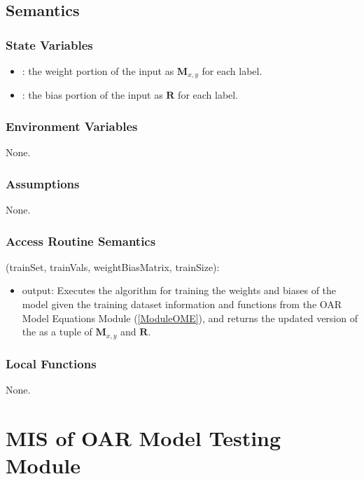 \documentclass[12pt, titlepage]{article}
\begin{document}
\subsection{Semantics}

\subsubsection{State Variables}

\begin{itemize}
\item {}: the weight portion of the  input as $\mathbf{M}_{x,y}$ for each label.
\item {}: the bias portion of the  input as $\mathbf{R}$ for each label.
\end{itemize}

\subsubsection{Environment Variables}

None.

\subsubsection{Assumptions}

None.

\subsubsection{Access Routine Semantics}

\noindent {}(trainSet, trainVals, weightBiasMatrix, trainSize):
\begin{itemize}
\item output: Executes the algorithm for training the weights and biases of the model given the
training dataset information and functions from the OAR Model Equations Module (\ref{ModuleOME}), and
returns the updated version of the  as a tuple of $\mathbf{M}_{x,y}$ and $\mathbf{R}$.
\end{itemize}

\subsubsection{Local Functions}

None.

\section{MIS of OAR Model Testing Module} \label{ModuleOMTs} 
\end{document}
